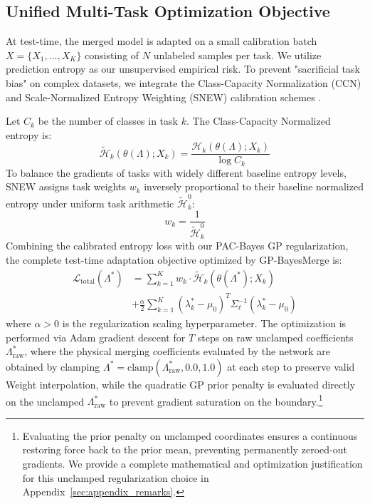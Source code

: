 \subsection{Unified Multi-Task Optimization Objective}

At test-time, the merged model is adapted on a small calibration batch $X =
\{X_1, \dots, X_K\}$ consisting of $N$ unlabeled samples per task. We utilize
prediction entropy as our unsupervised empirical risk. To prevent "sacrificial
task bias" on complex datasets, we integrate the Class-Capacity Normalization
(CCN) and Scale-Normalized Entropy Weighting (SNEW) calibration schemes
\cite{trial2_submission1}.

Let $C_k$ be the number of classes in task $k$. The Class-Capacity Normalized entropy is:
\begin{equation}
\tilde{\mathcal{H}}_k(\theta(\Lambda); X_k) = \frac{\mathcal{H}_k(\theta(\Lambda); X_k)}{\log C_k}
\label{eq:ccn_entropy}
\end{equation}
To balance the gradients of tasks with widely different baseline entropy levels,
SNEW assigns task weights $w_k$ inversely proportional to their baseline
normalized entropy under uniform task arithmetic $\tilde{\mathcal{H}}_k^0$:
\begin{equation}
w_k = \frac{1}{\tilde{\mathcal{H}}_k^0}
\label{eq:snew_weight}
\end{equation}
Combining the calibrated entropy loss with our PAC-Bayes GP regularization, the
complete test-time adaptation objective optimized by GP-BayesMerge is:
\begin{equation}
\label{eq:total_objective}
\begin{aligned}
\mathcal{L}_{\text{total}}(\Lambda^*) &= \sum_{k=1}^K w_k \cdot
\tilde{\mathcal{H}}_k(\theta(\Lambda^*); X_k) \\
&+ \frac{\alpha}{2} \sum_{k=1}^K (\lambda_k^* - \mu_0)^T \Sigma_{\ell}^{-1} (\lambda_k^* - \mu_0)
\end{aligned}
\end{equation}
where $\alpha > 0$ is the regularization scaling hyperparameter. The
optimization is performed via Adam gradient descent for $T$ steps on raw
unclamped coefficients $\Lambda^*_{\text{raw}}$, where the physical merging
coefficients evaluated by the network are obtained by clamping $\Lambda^* =
\text{clamp}(\Lambda^*_{\text{raw}}, 0.0, 1.0)$ at each step to preserve valid Weight
interpolation, while the quadratic GP prior penalty is evaluated directly on the
unclamped $\Lambda^*_{\text{raw}}$ to prevent gradient saturation on the boundary.\footnote{Evaluating the prior penalty on unclamped coordinates ensures a continuous restoring force back to the prior mean, preventing permanently zeroed-out gradients. We provide a complete mathematical and optimization justification for this unclamped regularization choice in Appendix~\ref{sec:appendix_remarks}.}
